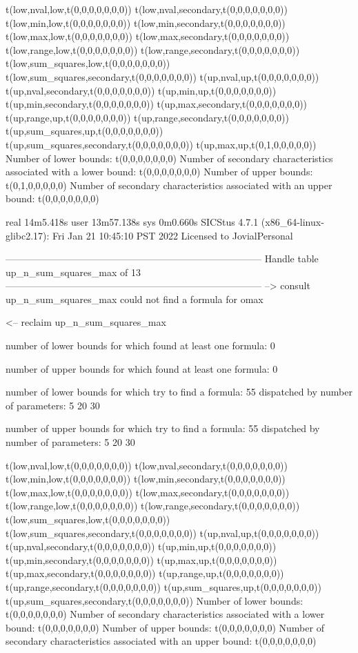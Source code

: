 t(low,nval,low,t(0,0,0,0,0,0,0))
t(low,nval,secondary,t(0,0,0,0,0,0,0))
t(low,min,low,t(0,0,0,0,0,0,0))
t(low,min,secondary,t(0,0,0,0,0,0,0))
t(low,max,low,t(0,0,0,0,0,0,0))
t(low,max,secondary,t(0,0,0,0,0,0,0))
t(low,range,low,t(0,0,0,0,0,0,0))
t(low,range,secondary,t(0,0,0,0,0,0,0))
t(low,sum_squares,low,t(0,0,0,0,0,0,0))
t(low,sum_squares,secondary,t(0,0,0,0,0,0,0))
t(up,nval,up,t(0,0,0,0,0,0,0))
t(up,nval,secondary,t(0,0,0,0,0,0,0))
t(up,min,up,t(0,0,0,0,0,0,0))
t(up,min,secondary,t(0,0,0,0,0,0,0))
t(up,max,secondary,t(0,0,0,0,0,0,0))
t(up,range,up,t(0,0,0,0,0,0,0))
t(up,range,secondary,t(0,0,0,0,0,0,0))
t(up,sum_squares,up,t(0,0,0,0,0,0,0))
t(up,sum_squares,secondary,t(0,0,0,0,0,0,0))
t(up,max,up,t(0,1,0,0,0,0,0))
Number of lower bounds:                                             t(0,0,0,0,0,0,0)
Number of secondary characteristics associated with a lower bound:  t(0,0,0,0,0,0,0)
Number of upper bounds:                                             t(0,1,0,0,0,0,0)
Number of secondary characteristics associated with an upper bound: t(0,0,0,0,0,0,0)

real	14m5.418s
user	13m57.138s
sys	0m0.660s
SICStus 4.7.1 (x86_64-linux-glibc2.17): Fri Jan 21 10:45:10 PST 2022
Licensed to JovialPersonal


--------------------------------------------------------------------------------
Handle table up_n_sum_squares_max of 13
--------------------------------------------------------------------------------
--> consult up_n_sum_squares_max
could not find a formula for omax

<-- reclaim up_n_sum_squares_max

number of lower bounds for which found at least one formula: 0

number of upper bounds for which found at least one formula: 0

number of lower bounds for which try to find a formula: 55
dispatched by number of parameters: 5  20  30

number of upper bounds for which try to find a formula: 55
dispatched by number of parameters: 5  20  30

t(low,nval,low,t(0,0,0,0,0,0,0))
t(low,nval,secondary,t(0,0,0,0,0,0,0))
t(low,min,low,t(0,0,0,0,0,0,0))
t(low,min,secondary,t(0,0,0,0,0,0,0))
t(low,max,low,t(0,0,0,0,0,0,0))
t(low,max,secondary,t(0,0,0,0,0,0,0))
t(low,range,low,t(0,0,0,0,0,0,0))
t(low,range,secondary,t(0,0,0,0,0,0,0))
t(low,sum_squares,low,t(0,0,0,0,0,0,0))
t(low,sum_squares,secondary,t(0,0,0,0,0,0,0))
t(up,nval,up,t(0,0,0,0,0,0,0))
t(up,nval,secondary,t(0,0,0,0,0,0,0))
t(up,min,up,t(0,0,0,0,0,0,0))
t(up,min,secondary,t(0,0,0,0,0,0,0))
t(up,max,up,t(0,0,0,0,0,0,0))
t(up,max,secondary,t(0,0,0,0,0,0,0))
t(up,range,up,t(0,0,0,0,0,0,0))
t(up,range,secondary,t(0,0,0,0,0,0,0))
t(up,sum_squares,up,t(0,0,0,0,0,0,0))
t(up,sum_squares,secondary,t(0,0,0,0,0,0,0))
Number of lower bounds:                                             t(0,0,0,0,0,0,0)
Number of secondary characteristics associated with a lower bound:  t(0,0,0,0,0,0,0)
Number of upper bounds:                                             t(0,0,0,0,0,0,0)
Number of secondary characteristics associated with an upper bound: t(0,0,0,0,0,0,0)

